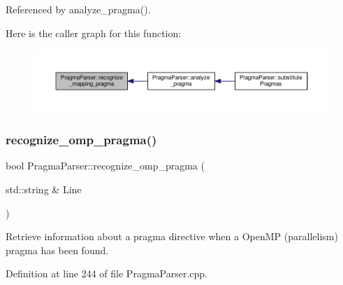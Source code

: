 Referenced by analyze\+\_\+pragma().

Here is the caller graph for this function\+:
\nopagebreak
\begin{figure}[H]
\begin{center}
\leavevmode
\includegraphics[width=350pt]{d6/d6c/classPragmaParser_a56dfb19826945b520fbfb880bf3c1442_icgraph}
\end{center}
\end{figure}
\mbox{\label{classPragmaParser_abfa77814950337fb487e7e10fa12e696}} 
\subsubsection{\texorpdfstring{recognize\+\_\+omp\+\_\+pragma()}{recognize\_omp\_pragma()}}
{\footnotesize\ttfamily bool Pragma\+Parser\+::recognize\+\_\+omp\+\_\+pragma (\begin{DoxyParamCaption}\item[{std\+::string \&}]{Line }\end{DoxyParamCaption})\hspace{0.3cm}{\ttfamily [private]}}



Retrieve information about a pragma directive when a Open\+MP (parallelism) pragma has been found. 



Definition at line 244 of file Pragma\+Parser.\+cpp.




